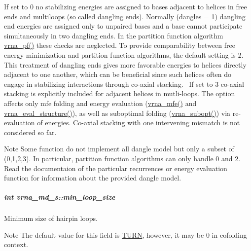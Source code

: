 If set to 0 no stabilizing energies are assigned to bases adjacent to helices in free ends and multiloops (so called dangling ends). Normally (dangles = 1) dangling end energies are assigned only to unpaired bases and a base cannot participate simultaneously in two dangling ends. In the partition function algorithm \hyperlink{group__pf__fold_ga29e256d688ad221b78d37f427e0e99bc}{vrna\+\_\+pf()} these checks are neglected. To provide comparability between free energy minimization and partition function algorithms, the default setting is 2. This treatment of dangling ends gives more favorable energies to helices directly adjacent to one another, which can be beneficial since such helices often do engage in stabilizing interactions through co-\/axial stacking.~\newline
If set to 3 co-\/axial stacking is explicitly included for adjacent helices in mutli-\/loops. The option affects only mfe folding and energy evaluation (\hyperlink{group__mfe__fold_gabd3b147371ccf25c577f88bbbaf159fd}{vrna\+\_\+mfe()} and \hyperlink{group__eval_ga58f199f1438d794a265f3b27fc8ea631}{vrna\+\_\+eval\+\_\+structure()}), as well as suboptimal folding (\hyperlink{group__subopt__wuchty_ga7988544ae3fc6334c1517cf76e5660aa}{vrna\+\_\+subopt()}) via re-\/evaluation of energies. Co-\/axial stacking with one intervening mismatch is not considered so far. \begin{DoxyNote}{Note}
Some function do not implement all dangle model but only a subset of (0,1,2,3). In particular, partition function algorithms can only handle 0 and 2. Read the documentaion of the particular recurrences or energy evaluation function for information about the provided dangle model. 
\end{DoxyNote}
\hypertarget{group__model__details_a9ed7ba42fcc46915c5c0c524f3d255f5}{}
\subparagraph[{min\+\_\+loop\+\_\+size}]{\setlength{\rightskip}{0pt plus 5cm}int vrna\+\_\+md\+\_\+s\+::min\+\_\+loop\+\_\+size}\label{group__model__details_a9ed7ba42fcc46915c5c0c524f3d255f5}


Minimum size of hairpin loops. 

\begin{DoxyNote}{Note}
The default value for this field is \hyperlink{energy__const_8h_ae646250fd59311356c7e5722a81c3a96}{T\+U\+R\+N}, however, it may be 0 in cofolding context. 
\end{DoxyNote}


